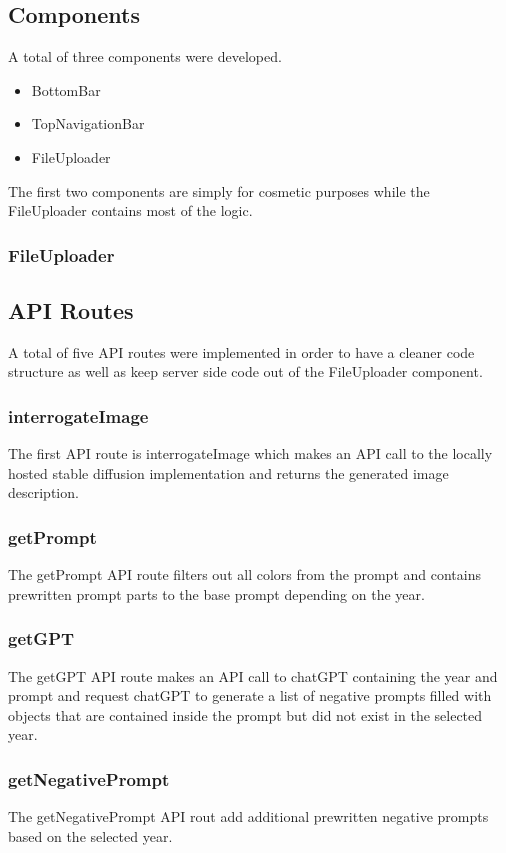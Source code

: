 \documentclass[english,notitlepage,smartquotes]{hgbreport}
\begin{document}
\subsection{Components}
A total of three components were developed. \begin{itemize}
    \item BottomBar 
    \item TopNavigationBar
    \item FileUploader
\end{itemize}
The first two components are simply for cosmetic purposes while the FileUploader contains most of the logic.
\subsubsection{FileUploader}


\subsection{API Routes}
A total of five API routes were implemented in order to have a cleaner code structure as well as keep server side code out of the FileUploader component.
\subsubsection{interrogateImage}
The first API route is interrogateImage which makes an API call to the locally hosted stable diffusion implementation and returns the generated image description.
\subsubsection{getPrompt}
The getPrompt API route filters out all colors from the prompt and contains prewritten prompt parts to the base prompt depending on the year.
\subsubsection{getGPT}
The getGPT API route makes an API call to chatGPT containing the year and prompt and request chatGPT to generate a list of negative prompts filled with objects that are contained inside the prompt but did not exist in the selected year.
\subsubsection{getNegativePrompt}
The getNegativePrompt API rout add additional prewritten negative prompts based on the selected year.
\end{document}
